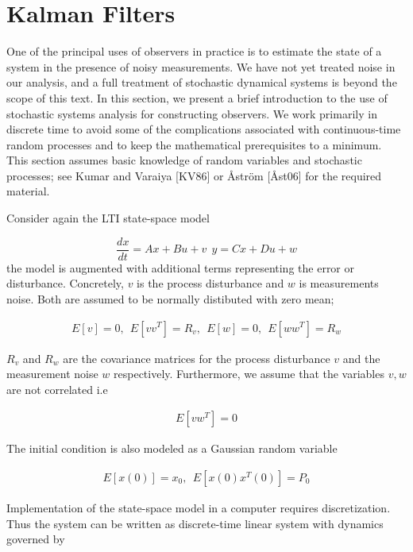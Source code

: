 \chapter{Kalman Filters}
\label{kalman_filters}

One of the principal uses of observers in practice is to estimate the state of a
system in the presence of noisy measurements. We have not yet treated noise in our
analysis, and a full treatment of stochastic dynamical systems is beyond the scope
of this text. In this section, we present a brief introduction to the use of stochastic
systems analysis for constructing observers. We work primarily in discrete time to
avoid some of the complications associated with continuous-time random processes
and to keep the mathematical prerequisites to a minimum. This section assumes
basic knowledge of random variables and stochastic processes; see Kumar and
Varaiya [KV86] or Åström [Åst06] for the required material.

Consider again the LTI state-space model

\begin{equation}
\frac{dx}{dt} = Ax + Bu +v  ~~ y = Cx + Du +w 
\end{equation}
the model is augmented with additional terms representing the error or disturbance. Concretely,
$v$ is the process disturbance and $w$ is measurements noise. Both are assumed to be normally distibuted with zero mean;

\begin{eqnarray}
E[v] = 0, ~~ E[vv^T] = R_v, ~~ E[w] = 0, ~~ E[ww^T] = R_w 
\label{noise_proccess_1} 
\end{eqnarray}

$R_v$ and $R_w$ are the covariance matrices for the process disturbance $v$ and the measurement noise $w$ respectively. Furthermore, we assume that the variables $v, w$ are not correlated i.e 

\begin{eqnarray}
E[vw^T] = 0
\label{noise_proccess_2} 
\end{eqnarray}

The initial condition is also modeled as a Gaussian random variable

\begin{eqnarray}
E[x(0)] = x_0, ~~ E[x(0)x^{T}(0)] = P_0
\label{noise_proccess_3} 
\end{eqnarray}

Implementation of the state-space model in a computer requires discretization. Thus the system can be written as discrete-time linear system with dynamics governed by


